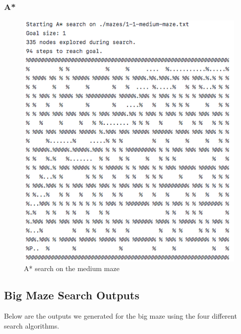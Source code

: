 \documentclass[titlepage]{article}
\begin{document}
\subsubsection*{A*}
\begin{figure}[h!]
\includegraphics[width=\linewidth]{astarmedium.png}
\caption{A* search on the medium maze}
\label{fig:greedymedium}
\end{figure}

\newpage


\subsection*{Big Maze Search Outputs}
Below are the outputs we generated for the big maze using the four different search algorithms. 
\end{document}

